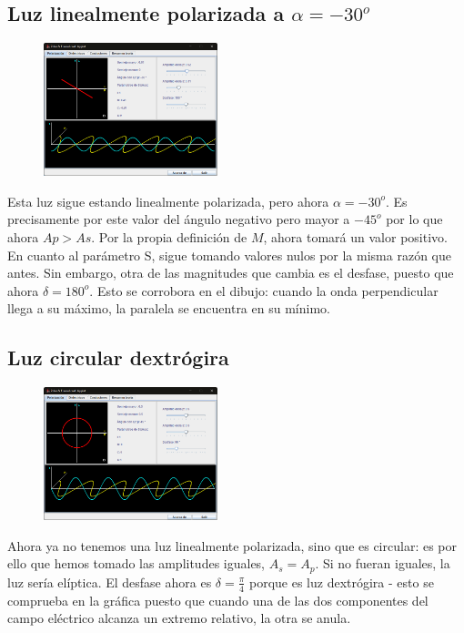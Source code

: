 \documentclass[11pt]{article}
\begin{document}
    \subsection{Luz linealmente polarizada a $\alpha = -30^o$}
    \begin{figure}
        \vspace{-0.25cm}
        \centering
        \includegraphics[width=0.45\textwidth]{fotos/luz lin pol -30.png}
    \end{figure}
    \noindent Esta luz sigue estando linealmente polarizada, pero ahora $\alpha = -30^o$. Es precisamente por este valor del ángulo negativo pero mayor a $-45^o$ por lo que ahora $Ap > As$. Por la propia definición de $M$, ahora tomará un valor positivo.\\

    \noindent En cuanto al parámetro S, sigue tomando valores nulos por la misma razón que antes. Sin embargo, otra de las magnitudes que cambia es el desfase, puesto que ahora $\delta = 180^o$. Esto se corrobora en el dibujo: cuando la onda perpendicular llega a su máximo, la paralela se encuentra en su mínimo.
    
    \newpage
    \subsection{Luz circular dextrógira}
    \begin{figure}
        \vspace{-0.5cm}
        \centering
        \includegraphics[width=0.45\textwidth]{fotos/luz circular dextrógira.png}
    \end{figure}
    \noindent Ahora ya no tenemos una luz linealmente polarizada, sino que es circular: es por ello que hemos tomado las amplitudes iguales, $A_s = A_p$. Si no fueran iguales, la luz sería elíptica. El desfase ahora es $\delta = \frac{\pi}{4}$ porque es luz dextrógira - esto se comprueba en la gráfica puesto que cuando una de las dos componentes del campo eléctrico alcanza un extremo relativo, la otra se anula. \\
\end{document}
